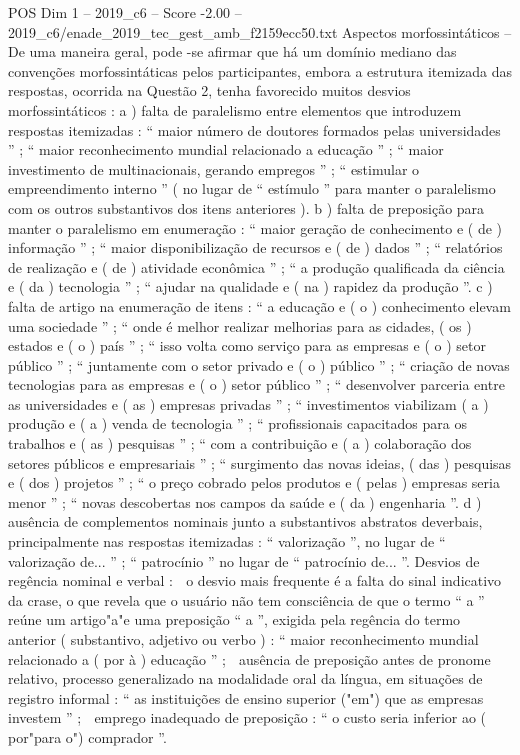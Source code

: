\begin{textsample}{POS Dim 1 – 2019\_c6 – Score -2.00 – 2019\_c6/enade\_2019\_tec\_gest\_amb\_f2159ecc50.txt}
Aspectos morfossintáticos – De uma maneira geral, pode -se afirmar que há um domínio mediano das convenções morfossintáticas pelos participantes, embora a estrutura itemizada das respostas, ocorrida na Questão 2, tenha favorecido muitos desvios morfossintáticos : a ) falta de paralelismo entre elementos que introduzem respostas itemizadas : “ maior número de doutores formados pelas universidades ” ; “ maior reconhecimento mundial relacionado a educação ” ; “ maior investimento de multinacionais, gerando empregos ” ; “ estimular o empreendimento interno ” ( no lugar de “ estímulo ” para manter o paralelismo com os outros substantivos dos itens anteriores ). b ) falta de preposição para manter o paralelismo em enumeração : “ maior geração de conhecimento e ( de ) informação ” ; “ maior disponibilização de recursos e ( de ) dados ” ; “ relatórios de realização e ( de ) atividade econômica ” ; “ a produção qualificada da ciência e ( da ) tecnologia ” ; “ ajudar na qualidade e ( na ) rapidez da produção ”. c ) falta de artigo na enumeração de itens : “ a educação e ( o ) conhecimento elevam uma sociedade ” ; “ onde é melhor realizar melhorias para as cidades, ( os ) estados e ( o ) país ” ; “ isso volta como serviço para as empresas e ( o ) setor público ” ; “ juntamente com o setor privado e ( o ) público ” ; “ criação de novas tecnologias para as empresas e ( o ) setor público ” ; “ desenvolver parceria entre as universidades e ( as ) empresas privadas ” ; “ investimentos viabilizam ( a ) produção e ( a ) venda de tecnologia ” ; “ profissionais capacitados para os trabalhos e ( as ) pesquisas ” ; “ com a contribuição e ( a ) colaboração dos setores públicos e empresariais ” ; “ surgimento das novas ideias, ( das ) pesquisas e ( dos ) projetos ” ; “ o preço cobrado pelos produtos e ( pelas ) empresas seria menor ” ; “ novas descobertas nos campos da saúde e ( da ) engenharia ”. d ) ausência de complementos nominais junto a substantivos abstratos deverbais, principalmente nas respostas itemizadas : “ valorização ”, no lugar de “ valorização de... ” ; “ patrocínio ” no lugar de “ patrocínio de... ”.
Desvios de regência nominal e verbal :  o desvio mais frequente é a falta do sinal indicativo da crase, o que revela que o usuário não tem consciência de que o termo “ a ” reúne um artigo"a"e uma preposição “ a ”, exigida pela regência do termo anterior ( substantivo, adjetivo ou verbo ) : “ maior reconhecimento mundial relacionado a ( por à ) educação ” ;  ausência de preposição antes de pronome relativo, processo generalizado na modalidade oral da língua, em situações de registro informal : “ as instituições de ensino superior ("em") que as empresas investem ” ;  emprego inadequado de preposição : “ o custo seria inferior ao ( por"para o") comprador ”.

\end{textsample}
